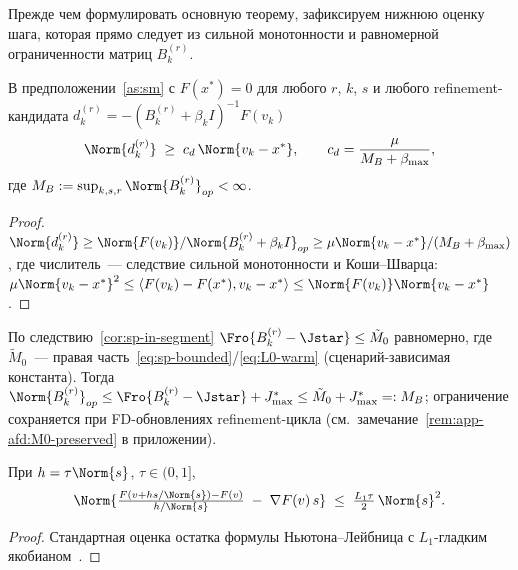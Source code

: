 Прежде чем формулировать основную теорему, зафиксируем нижнюю оценку
шага, которая прямо следует из сильной монотонности и равномерной
ограниченности матриц $B_k^{(r)}$.

\begin{lemma}\label{lem:step-lb}
В предположении~\ref{as:sm} с $F(x^{*}) = 0$ для любого $r$, $k$, $s$
и любого refinement-кандидата $d_k^{(r)} = -(B_k^{(r)} + \beta_k I)^{-1}F(v_k)$
\begin{equation}
\Norm{d_k^{(r)}} \;\ge\; c_d \,\Norm{v_k - x^{*}},
\qquad
c_d = \frac{\mu}{M_B + \beta_{\max}},
\label{eq:step-lb}
\end{equation}
где $M_B := \sup_{k, s, r}\Norm{B_k^{(r)}}_{op} < \infty$.
\end{lemma}

\begin{proof}
$\Norm{d_k^{(r)}} \ge \Norm{F(v_k)}/\Norm{B_k^{(r)} + \beta_k I}_{op}
\ge \mu\Norm{v_k - x^{*}}/(M_B + \beta_{\max})$,
где числитель~--- следствие сильной монотонности и Коши--Шварца:
$\mu\Norm{v_k - x^{*}}^{2} \le \langle F(v_k) - F(x^{*}), v_k - x^{*}\rangle
\le \Norm{F(v_k)}\Norm{v_k - x^{*}}$.
\end{proof}

\begin{remark}[Конечность $M_B$]\label{rem:MB-finite}
По следствию~\ref{cor:sp-in-segment} $\Fro{B_k^{(r)} - \Jstar} \le \tilde M_{0}$
равномерно, где $\tilde M_{0}$~--- правая часть~\eqref{eq:sp-bounded}/\eqref{eq:L0-warm}
(сценарий-зависимая константа). Тогда $\Norm{B_k^{(r)}}_{op} \le
\Fro{B_k^{(r)} - \Jstar} + J^{*}_{\max} \le \tilde M_{0} + J^{*}_{\max} =: M_B$;
ограничение сохраняется при FD-обновлениях refinement-цикла
(см.\ замечание~\ref{rem:app-afd:M0-preserved} в приложении).
\end{remark}

\begin{lemma}
\label{lem:fd}
При $h = \tau \Norm{s}$, $\tau \in (0, 1]$,
\[
\Norm{\tfrac{F(v + h s/\Norm{s}) - F(v)}{h/\Norm{s}} \;-\; \nabla F(v)\, s}
\;\le\; \tfrac{L_1 \tau}{2}\,\Norm{s}^2.
\]
\end{lemma}

\begin{proof}
Стандартная оценка остатка формулы Ньютона--Лейбница с $L_1$-гладким
якобианом~\cite[Lemma~4.1.12]{dennis1996}.
\end{proof}

